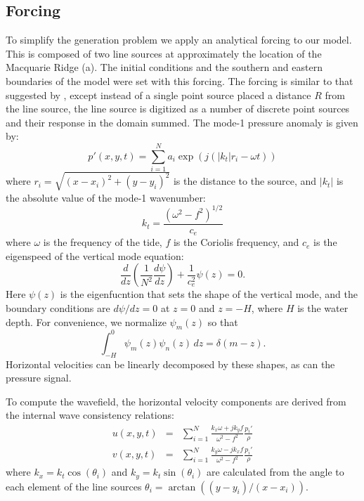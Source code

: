 \documentclass[10pt]{article}
\begin{document}
%
%
%
%
%
%
%

\subsection{Forcing}

To simplify the generation problem we apply an analytical forcing to our model.  This is composed of two line sources at approximately the location of the Macquarie Ridge (a).  The initial conditions and the southern and eastern boundaries of the model were set with this forcing.  The forcing is similar to that suggested by \citet{rainvilleetal10}, except instead of a single point source placed a distance $R$ from the line source, the line source is digitized as a number of discrete point sources and their response in the domain summed.  The mode-1 pressure anomaly is given by:
\begin{equation}
  p'(x,y,t)=\sum_{i=1}^{N}  a_i \exp\left(j\left(|k_t|r_i - \omega t\right)\right)
\end{equation}
where $r_i=\sqrt{\left(x-x_i\right)^2+\left(y-y_i\right)^2}$ is the distance to the source, and $|k_t|$ is the absolute value of the mode-1 wavenumber:
\begin{equation}
  k_t = \frac{\left(\omega^2-f^2\right)^{1/2}}{c_e}
\end{equation}
where $\omega$ is the frequency of the tide, $f$ is the Coriolis frequency, and $c_e$ is the eigenspeed of the vertical mode equation:
\begin{equation}
  \frac{d}{dz}\left(\frac{1}{N^2}\frac{d\psi}{dz}\right)
 + \frac{1}{c_e^2}\psi(z)=0.
\end{equation}
Here $\psi(z)$ is the eigenfucntion that sets the shape of the vertical mode, and the boundary conditions are $d\psi/dz=0$ at $z=0$ and $z=-H$, where $H$ is the water depth.  For convenience, we normalize $\psi_m(z)$ so that 
\begin{equation}
  \int_{-H}^0 \psi_m(z)\psi_n(z)\, dz = \delta(m-z).
\end{equation}
Horizontal velocities can be linearly decomposed by these shapes, as can the pressure signal.  

To compute the wavefield, the horizontal velocity components are derived from the internal wave consistency relations: 
\begin{eqnarray}
  u(x,y,t) & = &\sum_{i=1}^{N}  \frac{k_x\omega + j k_y f}{\omega^2-f^2} \frac{p_i'}{\rho}\\
  v(x,y,t) &=& \sum_{i=1}^{N}  \frac{k_y\omega - j k_x f}{\omega^2-f^2} \frac{p_i'}{\rho} 
\end{eqnarray}
where $k_x=k_t\cos(\theta_i)$ and $k_y=k_t\sin(\theta_i)$ are calculated from the angle to  each element of the line sources $\theta_i = \arctan((y-y_i)/(x-x_i))$.  
\end{document}
